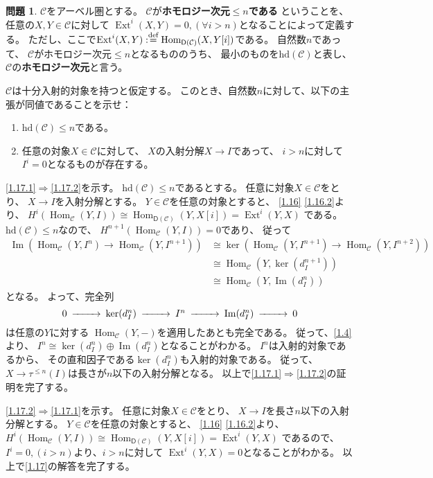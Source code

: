 \documentclass[uplatex,dvipdfmx]{jsarticle}
\makeatletter
\theoremstyle{definition}
\newtheorem{prob}[prob]{問題}
\renewenvironment{proof}[1][\proofname]{
  \pushQED{\qed}%
  \normalfont \topsep6\p@\@plus6\p@\relax
  \trivlist
  \item[\hskip\labelsep
    #1\@addpunct{\textbf{.}}]\ignorespaces
}{%
  \popQED\endtrivlist\@endpefalse
}
\providecommand{\proofname}{証明}
\DeclareMathOperator{\Hom}{\mathrm{Hom}}
\DeclareMathOperator{\im}{\mathrm{Im}}
\newcommand{\hd}{\mathrm{hd}}
\DeclareMathOperator{\Ext}{\mathrm{Ext}}
\newcommand{\sfD}{\mathsf{D}}
\newcommand\mcC{\mathcal{C}}
\def\dfn{:\overset{\mbox{{\scriptsize def}}}{=}}
\makeatother
\begin{document}
\begin{prob}\label{1.17}
  \(\mcC\)をアーベル圏とする。
  \(\mcC\)が\textbf{ホモロジー次元\(\leq n\)である}
  ということを、任意の\(X,Y\in \mcC\)に対して
  \(\Ext^i(X,Y) = 0 ,(\forall i > n)\)となることによって定義する。
  ただし、ここで\(\Ext^i(X,Y) \dfn \Hom_{\sfD(\mcC)}(X,Y[i])\)である。
  自然数\(n\)であって、
  \(\mcC\)がホモロジー次元\(\leq n\)となるもののうち、
  最小のものを\(\hd(\mcC)\)と表し、
  \(\mcC\)の\textbf{ホモロジー次元}と言う。

  \(\mcC\)は十分入射的対象を持つと仮定する。
  このとき、自然数\(n\)に対して、以下の主張が同値であることを示せ：
  \begin{enumerate}
    \item \label{1.17.1}
    \(\hd(\mcC) \leq n\)である。
    \item \label{1.17.2}
    任意の対象\(X\in \mcC\)に対して、
    \(X\)の入射分解\(X\to I\)であって、
    \(i > n\)に対して\(I^i = 0\)となるものが存在する。
  \end{enumerate}
\end{prob}

\begin{proof}
  \ref{1.17.1}\(\Rightarrow\)\ref{1.17.2}を示す。
  \(\hd(\mcC)\leq n\)であるとする。
  任意に対象\(X\in \mcC\)をとり、
  \(X\to I\)を入射分解とする。
  \(Y\in \mcC\)を任意の対象とすると、
  \autoref{1.16} \ref{1.16.2}より、
  \(H^i(\Hom_{\mcC}(Y,I)) \cong \Hom_{\sfD(\mcC)}(Y,X[i]) = \Ext^i(Y,X)\)
  である。
  \(\hd(\mcC)\leq n\)なので、
  \(H^{n+1}(\Hom_{\mcC}(Y,I)) = 0\)であり、
  従って
  \begin{align*}
    \im(\Hom_{\mcC}(Y,I^n)\to \Hom_{\mcC}(Y,I^{n+1}))
    &\cong \ker(\Hom_{\mcC}(Y,I^{n+1})\to \Hom_{\mcC}(Y,I^{n+2})) \\
    &\cong \Hom_{\mcC}(Y,\ker(d_I^{n+1})) \\
    &\cong \Hom_{\mcC}(Y,\im(d_I^n))
  \end{align*}
  となる。
  よって、完全列
  \[
  \begin{CD}
    0 @>>> \ker(d_I^n) @>>> I^n @>>> \im(d_I^n) @>>> 0
  \end{CD}
  \]
  は任意の\(Y\)に対する
  \(\Hom_{\mcC}(Y,-)\)を適用したあとも完全である。
  従って、\autoref{1.4}より、
  \(I^n\cong \ker(d_I^n) \oplus \im(d_I^n)\)となることがわかる。
  \(I^n\)は入射的対象であるから、
  その直和因子である\(\ker(d_I^n)\)も入射的対象である。
  従って、\(X\to \tau^{\leq n}(I)\)は長さが\(n\)以下の入射分解となる。
  以上で\ref{1.17.1}\(\Rightarrow\)\ref{1.17.2}の証明を完了する。

  \ref{1.17.2}\(\Rightarrow\)\ref{1.17.1}を示す。
  任意に対象\(X\in \mcC\)をとり、
  \(X\to I\)を長さ\(n\)以下の入射分解とする。
  \(Y\in \mcC\)を任意の対象とすると、
  \autoref{1.16} \ref{1.16.2}より、
  \(H^i(\Hom_{\mcC}(Y,I)) \cong \Hom_{\sfD(\mcC)}(Y,X[i]) = \Ext^i(Y,X)\)
  であるので、\(I^i = 0, (i>n)\)より、\(i>n\)に対して
  \(\Ext^i(Y,X) = 0\)となることがわかる。
  以上で\autoref{1.17}の解答を完了する。
\end{proof}
\end{document}
